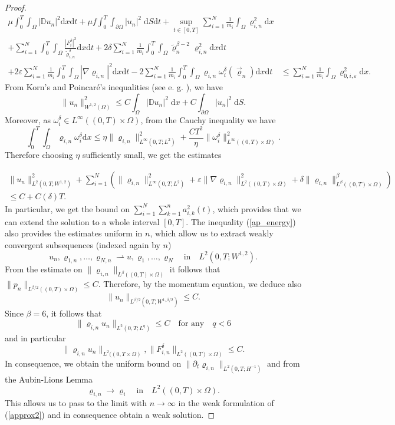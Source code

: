\documentclass[11pt]{article}
\newcommand{\dd}{\mathrm{d}}
\numberwithin{equation}{section}
\numberwithin{tw}{section}
\begin{document}
\begin{proof}
\[\begin{aligned} \mu\int_0^T\int_\Omega |\mathbb{D} u_n|^2\dd x\dd t + \mu f\int_0^T\int_{\partial\Omega} |u_n|^2\;\dd S\dd t + \sup_{t\in [0,T]}\sum_{i=1}^N\frac{1}{m_i}\int_\Omega\varrho_{i,n}^2\dd x \\
+ \sum_{i=1}^N\int_0^T\int_\Omega \frac{|F_{i}^\delta|^2}{\tilde\varrho_{i,n}^\delta}\dd x\dd t +2\delta\sum_{i=1}^N\frac{1}{m_i}\int_0^T\int_\Omega \tilde\varrho_n^{\beta-2}\varrho_{i,n}^2\dd x\dd t \\
+2\varepsilon\sum_{i=1}^N\frac{1}{m_i}\int_0^T\int_\Omega |\nabla\varrho_{i,n}|^2\dd x\dd t - 2\sum_{i=1}^N\frac{1}{m_i}\int_0^T\int_\Omega\varrho_{i,n}\omega_i^\delta(\vec\varrho_n)\dd x\dd t &\leq \sum_{i=1}^N\frac{1}{m_i}\int_\Omega\varrho_{0,i,\varepsilon}^2\dd x. 
\end{aligned}\]
From Korn's and Poincar\'e's inequalities (see e. g. \cite{novotny-straskraba}), we have
\[ \|u_n\|_{W^{1,2}(\Omega)}^2 \leq C\int_\Omega|\mathbb{D}u_n|^2\;\dd x + C\int_{\partial\Omega} |u_n|^2\;\dd S. \]
Moreover, as $\omega_i^\delta\in L^\infty((0,T)\times\Omega)$, from the Cauchy inequality we have
\[ \int_0^T\int_\Omega \varrho_{i,n}\omega_i^\delta\dd x \leq \eta\|\varrho_{i,n}\|_{L^\infty(0,T;L^2)}^2 + \frac{CT^2}{\eta}\|\omega_i^\delta\|_{L^\infty((0,T)\times\Omega)}^2. \]
Therefore choosing $\eta$ sufficiently small, we get the estimates

\begin{multline}\label{ap_energy} \|u_n\|_{L^2(0,T;W^{1,2})}^2 + \sum_{i=1}^N\left(\|\varrho_{i,n}\|_{L^\infty(0,T;L^2)}^2 + \varepsilon\|\nabla\varrho_{i,n}\|_{L^2((0,T)\times\Omega)}^2+\delta\|\varrho_{i,n}\|_{L^\beta((0,T)\times\Omega)}^\beta\right) \\
\leq C + C(\delta)T. \end{multline}
In particular, we get the bound on $\sum_{i=1}^N\sum_{k=1}^n a_{i,k}^2(t)$, which provides that we can extend the solution to a whole interval $[0,T]$. The inequality (\ref{ap_energy}) also provides the estimates uniform in $n$, which allow us to extract weakly convergent subsequences (indexed again by $n$)
\[ u_n,\varrho_{1,n},\dots,\varrho_{N,n} \rightharpoonup u,\varrho_1,\dots,\varrho_N \quad \text{in} \quad L^2(0,T;W^{1,2}). \]
From the estimate on $\|\varrho_{i,n}\|_{L^\beta((0,T)\times\Omega)}$ it follows that $\|p_n\|_{L^{\beta/2}((0,T)\times\Omega)} \leq C$. Therefore, by  the momentum equation, we deduce also 
\[ \|u_n\|_{L^{\beta/2}(0,T;W^{1,\beta/2})} \leq C. \]
Since $\beta=6$, it follows that 
\begin{equation}\label{beta_est} \|\varrho_{i,n}u_n\|_{L^2(0,T;L^q)} \leq C \quad \text{for any} \quad q<6 \end{equation}
and in particular
\[ \|\varrho_{i,n} u_n\|_{L^2((0,T\times\Omega)}, \|F_{i,n}^\delta\|_{L^2((0,T)\times\Omega)} \leq C. \]
In consequence, we obtain the uniform bound on $\|\partial_t\varrho_{i,n}\|_{L^2(0,T;H^{-1})}$ and from the Aubin-Lions Lemma
\[ \varrho_{i,n}\to \varrho_i \quad \text{in} \quad L^2((0,T)\times\Omega). \]
This allows us to pass to the limit with $n\to\infty$ in the weak formulation of (\ref{approx2}) and in consequence obtain a weak solution.
\end{proof}
\end{document}
